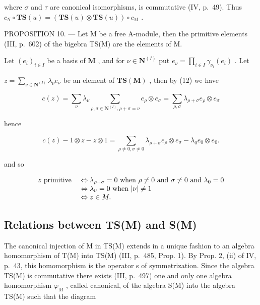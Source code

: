 where \(\sigma\) and \(\tau\) are canonical isomorphisms, is commutative (IV, p.~49). Thus \(c_{\mathrm{N}} \circ \mathbf{T}\mathbf{S}(u) = (\mathbf{T}\mathbf{S}(u) \otimes \mathbf{T}\mathbf{S}(u)) \circ c_{\mathrm{M}}\) .

PROPOSITION 10. --- Let M be a free A-module, then the primitive elements (III, p.~602) of the bigebra TS(M) are the elements of M.

Let \((e_i)_{i\in I}\) be a basis of \(\mathbf{M}\) , and for \(\nu \in \mathbf{N}^{(I)}\) put \(e_{\nu} = \prod_{i\in I}\gamma_{\nu_i}(e_i)\) . Let

\(z = \sum_{\nu \in \mathbf{N}^{(I)}} \lambda_{\nu} e_{\nu}\) be an element of \(\mathbf{T}\mathbf{S}(\mathbf{M})\) , then by (12) we have

\[
c (z) = \sum_ {\nu} \lambda_ {\nu} \sum_ {\rho , \sigma \in \mathbf {N} ^ {(I)}, \rho + \sigma = \nu} e _ {\rho} \otimes e _ {\sigma} = \sum_ {\rho , \sigma} \lambda_ {\rho + \sigma} e _ {\rho} \otimes e _ {\sigma}
\]

hence

\[
c (z) - 1 \otimes z - z \otimes 1 = \sum_ {\rho \neq 0, \sigma \neq 0} \lambda_ {\rho + \sigma} e _ {\rho} \otimes e _ {\sigma} - \lambda_ {0} e _ {0} \otimes e _ {0}.
\]

and so

\[
\begin{array}{r l} z \text {   primitive   } & \Leftrightarrow \lambda_ {\rho + \sigma} = 0 \text {   when   } \rho \neq 0 \text {   and   } \sigma \neq 0 \text {   and   } \lambda_ {0} = 0 \\ & \Leftrightarrow \lambda_ {\nu} = 0 \text {   when   } | \nu | \neq 1 \\ & \Leftrightarrow z \in M. \end{array}
\]

\subsection{Relations between TS(M) and S(M)}

The canonical injection of M in TS(M) extends in a unique fashion to an algebra homomorphism of T(M) into TS(M) (III, p.~485, Prop. 1). By Prop. 2, (ii) of IV, p.~43, this homomorphism is the operator s of symmetrization. Since the algebra TS(M) is commutative there exists (III, p.~497) one and only one algebra homomorphism \(\varphi_{M}\) , called canonical, of the algebra S(M) into the algebra TS(M) such that the diagram

